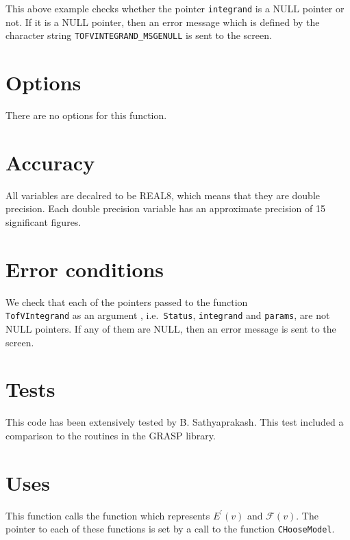 \documentclass[12pt]{article}
\begin{document}
\vspace{5mm}

This above example checks whether the pointer \texttt{integrand} is a NULL pointer or not. If it is a NULL pointer, then an error message which is defined by the character string \texttt{TOFVINTEGRAND\_MSGENULL} is sent to the screen.


\section{Options}

There are no options for this function.


\section{Accuracy}

All variables are decalred to be REAL8, which means that they are double precision.
Each double precision variable has an approximate precision of 15 significant figures.


\section{Error conditions}

We check that each of the pointers passed to the function \\ \texttt{TofVIntegrand} as an argument , i.e.\ \texttt{Status}, \texttt{integrand} and \texttt{params}, are not NULL pointers. If any of them are NULL, then an error message is sent to the screen.


\section{Tests}

This code has been extensively tested by B. Sathyaprakash. This test included a comparison to the routines in the GRASP library.

\section{Uses}

This function calls the function which represents $E^{\prime}(v)$ and $\mathcal{F}(v)$. The pointer to each of these functions is set by a call to the function \texttt{CHooseModel}.
\end{document}
